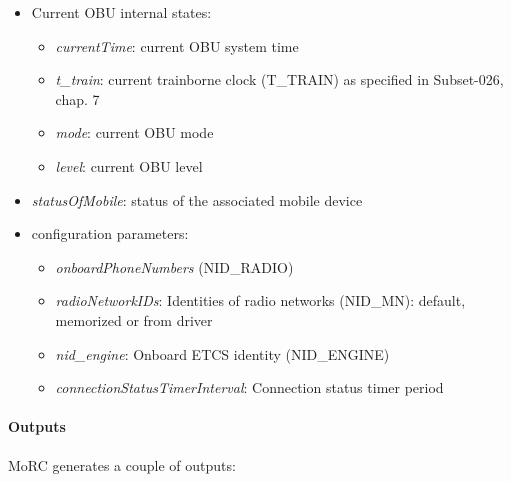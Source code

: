 \begin{itemize}
  \item Current OBU internal states:
  
  \begin{itemize}
   \item \textit{currentTime}: current OBU system time
   \item \textit{t\_train}: current trainborne clock (T\_TRAIN) as specified in Subset-026, chap. 7
   \item \textit{mode}: current OBU mode
   \item \textit{level}: current OBU level
  \end{itemize}

  \item \textit{statusOfMobile}: status of the associated mobile device
  
  \item configuration parameters:
  
   \begin{itemize}
    \item \textit{onboardPhoneNumbers} (NID\_RADIO)
    \item \textit{radioNetworkIDs}: Identities of radio networks (NID\_MN): default, memorized or from driver  
    \item \textit{nid\_engine}: Onboard ETCS identity (NID\_ENGINE)
    \item \textit{connectionStatusTimerInterval}: Connection status timer period 
   \end{itemize} 

 \end{itemize} 

\paragraph{Outputs}

MoRC generates a couple of outputs: 

